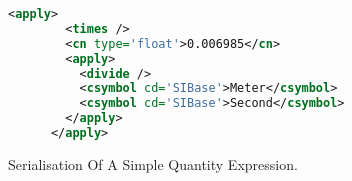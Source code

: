 \begin{figure}[h]
  \begin{center}
    \lstset{
      basicstyle=\footnotesize,
      xleftmargin=.2\textwidth, xrightmargin=.2\textwidth
    }

    \begin{lstlisting}[language=XML]
      <apply>
        <times />
        <cn type='float'>0.006985</cn>
        <apply>
          <divide />
          <csymbol cd='SIBase'>Meter</csymbol>
          <csymbol cd='SIBase'>Second</csymbol>
        </apply>
      </apply>
    \end{lstlisting}
  \end{center}
  \caption{Serialisation Of A Simple Quantity Expression. }
  \label{fig:ser1}
\end{figure}
